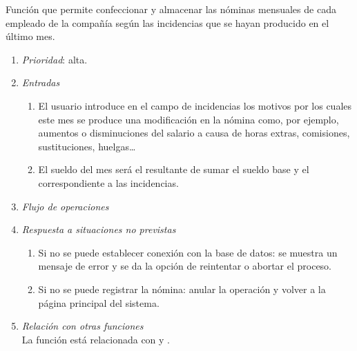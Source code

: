 

	Función que permite confeccionar y almacenar las nóminas mensuales de cada empleado de la compañía según las incidencias que se hayan producido en el último mes.
						
	\begin{enumerate}
		\item \textit{Prioridad}: alta.
		\item \textit{Entradas}
			\begin{enumerate}
				\item El usuario introduce en el campo de incidencias los motivos por los cuales este mes se produce una modificación en la nómina como, por ejemplo, aumentos o disminuciones del salario a causa de horas extras, comisiones, sustituciones, huelgas\ldots
				\item El sueldo del mes será el resultante de sumar el sueldo base y el correspondiente a las incidencias.
			\end{enumerate}
		\item \textit{Flujo de operaciones}
		\item \textit{Respuesta a situaciones no previstas}
			\begin{enumerate}
				\item Si no se puede establecer conexión con la base de datos: se muestra un mensaje de error y se da la opción de reintentar o abortar el proceso.
				\item Si no se puede registrar la nómina: anular la operación y volver a la página principal del sistema.
			\end{enumerate}				
		\item \textit{Relación con otras funciones}\\
		La función está relacionada con  y .
	\end{enumerate}
								
